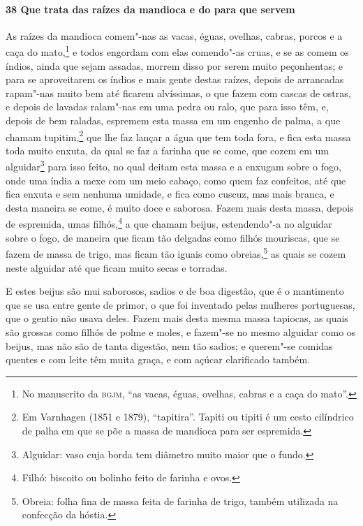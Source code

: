 \begin{linenumbers}
\paragraph{38 Que trata das raízes da mandioca e do para que servem}\quad
As raízes da mandioca comem"-nas as vacas, éguas, ovelhas, cabras, porcos e a caça do
mato,\footnote{ No manuscrito da \textsc{bgjm}, ``as vacas, éguas, ovelhas, cabras e a
caça do mato''.} e todos engordam com elas comendo"-as cruas, e se as comem os índios,
ainda que sejam assadas, morrem disso por serem muito peçonhentas; e para se aproveitarem
os índios e mais gente destas raízes, depois de arrancadas rapam"-nas muito bem até ficarem
alvíssimas, o que fazem com cascas de ostras, e depois de lavadas ralam"-nas em uma pedra
ou ralo, que para isso têm, e, depois de bem raladas, espremem esta massa em um engenho de
palma, a que chamam tupitim,\footnote{ Em Varnhagen (1851 e 1879), ``tapitira''. Tapiti ou
tipiti é um cesto cilíndrico de palha em que se põe a massa de mandioca para ser
espremida.} que lhe faz lançar a água que tem toda fora, e fica esta massa toda muito
enxuta, da qual se faz a farinha que se come, que cozem em um alguidar\footnote{ Alguidar:
vaso cuja borda tem diâmetro muito maior que o fundo.} para isso feito, no qual deitam
esta massa e a enxugam sobre o fogo, onde uma índia a mexe com um meio cabaço, como quem
faz confeitos, até que fica enxuta e sem nenhuma umidade, e fica como cuscuz, mas mais
branca, e desta maneira se come, é muito doce e saborosa. Fazem mais desta massa, depois
de espremida, umas filhós,\footnote{ Filhó: biscoito ou bolinho feito de farinha e ovos.}
a que chamam beijus, estendendo"-a no alguidar sobre o fogo, de maneira que ficam tão
delgadas como filhós mouriscas, que se fazem de massa de trigo, mas ficam tão iguais como
obreias,\footnote{ Obreia: folha fina de massa feita de farinha de trigo, também utilizada
na confecção da hóstia.} as quais se cozem neste alguidar até que ficam muito secas e
torradas.

E estes beijus são mui saborosos, sadios e de boa digestão, que é o mantimento que se usa
entre gente de primor, o que foi inventado pelas mulheres portuguesas, que o gentio não
usava deles. Fazem mais desta mesma massa tapiocas, as quais são grossas como filhós de
polme e moles, e fazem"-se no mesmo alguidar como os beijus, mas não são de tanta digestão,
nem tão sadios; e querem"-se comidas quentes e com leite têm muita graça, e com açúcar
clarificado também.


\end{linenumbers}
